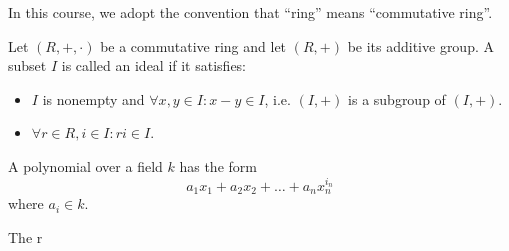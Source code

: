 \begin{defn}[Ideal]
\end{defn}


\begin{remark}
  In this course, we adopt the convention that ``ring'' means ``commutative
  ring''.
\end{remark}



\begin{defn}
  Let $(R,+,\cdot)$ be a commutative ring and let $(R, +)$ be its additive
  group. A subset $I$ is called an ideal if it satisfies:
  \begin{itemize}
    \item $I$ is nonempty and $\forall x,y \in I : x-y \in I$, i.e. $(I,+)$ is a
    subgroup of $(I,+)$.
    \item $\forall r \in R, i \in I : ri \in I$.
  \end{itemize}
\end{defn}


\begin{defn}
  A polynomial over a field $k$ has the form
  \[ a_1 x_1 + a_2 x_2 + \ldots + a_n x_n^{i_n}\]
  where $a_i \in k$.
\end{defn}

\begin{defn}
  The r
\end{defn}